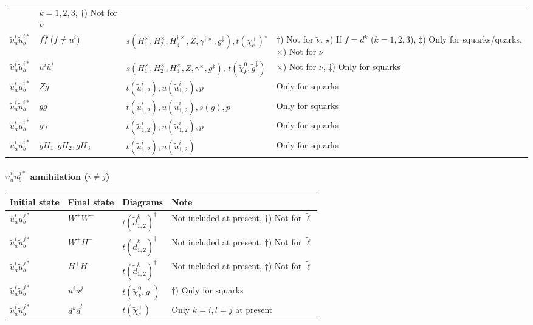 {\begin{center}
\begin{tabular}{llll}
& \parbox[t]{4cm}{$k=1,2,3$, $\dagger$) Not for $\tilde{\nu}$} \\
$\tilde{u}^i_a\tilde{u}^{i*}_b$ & $f \bar{f}$ ($f \ne u^i$) &
$s(H_{1}^\times,H_{2}^\times,H_3^{\dagger\times},Z,\gamma^{\dagger\times},g^\ddagger), t({\chi^+_c})^\star$
& \parbox[t]{4cm}{$\dagger$) Not for $\tilde{\nu}$, $\star$) If $f=d^k$ ($k=1,2,3$), $\ddagger$) Only for squarks/quarks, $\times$) Not for $\nu$} \\
$\tilde{u}^i_a\tilde{u}^{i*}_b$ & $u^i \bar{u}^i$ &
$s(H_{1}^\times,H_{2}^\times,H_3^{\times},Z,\gamma^{\times}, g^\ddagger)$, $t(\tilde{\chi}_{k}^0,\tilde{g}^\ddagger)$
& \parbox[t]{4cm}{$\times$) Not for $\nu$,
$\ddagger$) Only for squarks}  \\ 
$\tilde{u}^i_a\tilde{u}^{i*}_b$ & $Z g$ & $t(\tilde{u}^i_{1,2}), u(\tilde{u}^i_{1,2}), p$
& Only for squarks\\
$\tilde{u}^i_a\tilde{u}^{i*}_b$ & $g g$ & $t(\tilde{u}^i_{1,2}), u(\tilde{u}^i_{1,2}), s(g), p$
& Only for squarks\\
$\tilde{u}^i_a\tilde{u}^{i*}_b$ & $g \gamma$ & $t(\tilde{u}^i_{1,2}), u(\tilde{u}^i_{1,2}), p$
& Only for squarks\\
$\tilde{u}^i_a\tilde{u}^{i*}_b$ & $g H_1, g H_2, g H_3$ & 
$t(\tilde{u}^i_{1,2}), u(\tilde{u}^i_{1,2})$
& Only for squarks\\ \hline
\end{tabular}
\end{center}
}

\paragraph{$\tilde{u}^i_a\tilde{u}^{j*}_b$ annihilation ($i \ne j$)}

\begin{center}
\begin{tabular}{llll} \hline
{\bfseries Initial state} & {\bfseries Final state} &
{\bfseries Diagrams} & {\bfseries Note} \\ \hline \tabspace
$\tilde{u}^i_a\tilde{u}^{j*}_b$ & $W^+W^-$ &
$t(\tilde{d}^k_{1,2})^\dagger$
& Not included at present, $\dagger$) Not for $\tilde{\ell}$ \\
$\tilde{u}^i_a\tilde{u}^{j*}_b$ & $W^+ H^-$ &
$t(\tilde{d}^k_{1,2})^\dagger$
& Not included at present, $\dagger$) Not for $\tilde{\ell}$ \\
$\tilde{u}^i_a\tilde{u}^{j*}_b$ & $H^+ H^-$ &
$t(\tilde{d}^k_{1,2})^\dagger$
& Not included at present, $\dagger$) Not for $\tilde{\ell}$ \\
$\tilde{u}^i_a \tilde{u}^{j*}_b$ & $u^i \bar{u}^j$ &
$t(\tilde{\chi}_{k}^0,g^\dagger)$
& $\dagger$) Only for squarks \\
$\tilde{u}^i_a \tilde{u}^{j*}_b$ & $d^k \bar{d}^l$ &
$t(\tilde{\chi}_{c}^+)$
& Only $k=i,l=j$ at present \\ \hline
\end{tabular}
\end{center}


